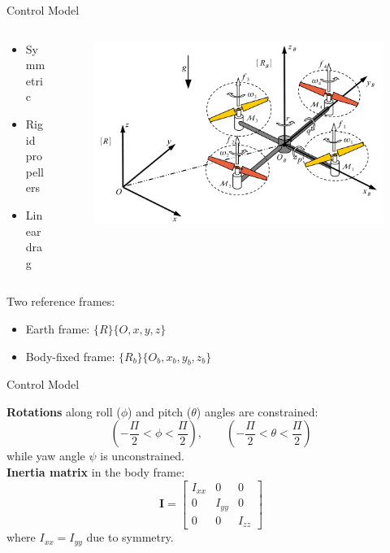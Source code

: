 \begin{frame}{Control Model}

\begin{columns}
\begin{column}{0.3\textwidth}
\begin{itemize}
	\item Symmetric
	\bigskip
	\item Rigid propellers
	\bigskip
	\item Linear drag
\end{itemize}
\end{column}
\begin{column}{0.7\textwidth}
\begin{figure}
	\centering
	\includegraphics[width=0.9\linewidth]{Images/Quad_model}
\end{figure}
\end{column}
\end{columns}
Two reference frames:\\
\bigskip
\begin{itemize}
\item Earth frame: $ \{R\}\{O, x, y, z\} $
\item Body-fixed frame: $ \{R_b\}\{O_b, x_b, y_b, z_b\} $
\end{itemize}

\end{frame}

\begin{frame}{Control Model}

\textbf{Rotations} along roll ($ \phi $) and pitch ($ \theta $) angles are constrained:
\begin{equation*}
(-\frac{\Pi}{2}<\phi<\frac{\Pi}{2}), \qquad (-\frac{\Pi}{2}<\theta<\frac{\Pi}{2})
\end{equation*}
while yaw angle $ \psi $ is unconstrained.\\
\bigskip
\textbf{Inertia matrix} in the body frame:
\begin{equation*}
\mathbf{I}=
\begin{bmatrix}
I_{xx} & 0 & 0 \\
0 & I_{yy} & 0 \\
0 & 0 & I_{zz} 
\end{bmatrix}
\end{equation*}
where $ I_{xx} = I_{yy} $ due to symmetry.

\end{frame}

